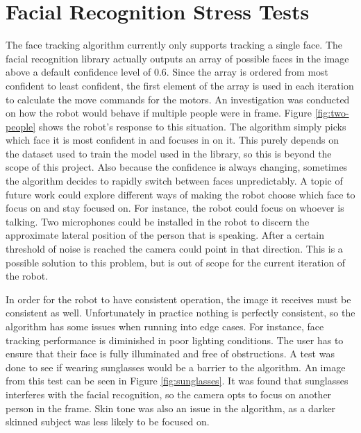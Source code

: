 \section{Facial Recognition Stress Tests}
The face tracking algorithm currently only supports tracking a single face. The facial recognition library actually outputs an array of possible faces in the image above a default confidence level of 0.6. Since the array is ordered from most confident to least confident, the first element of the array is used in each iteration to calculate the move commands for the motors. An investigation was conducted on how the robot would behave if multiple people were in frame. Figure \ref{fig:two-people} shows the robot's response to this situation. The algorithm simply picks which face it is most confident in and focuses in on it. This purely depends on the dataset used to train the model used in the library, so this is beyond the scope of this project. Also because the confidence is always changing, sometimes the algorithm decides to rapidly switch between faces unpredictably. A topic of future work could explore different ways of making the robot choose which face to focus on and stay focused on. For instance, the robot could focus on whoever is talking. Two microphones could be installed in the robot to discern the approximate lateral position of the person that is speaking. After a certain threshold of noise is reached the camera could point in that direction. This is a possible solution to this problem, but is out of scope for the current iteration of the robot. 

In order for the robot to have consistent operation, the image it receives must be consistent as well. Unfortunately in practice nothing is perfectly consistent, so the algorithm has some issues when running into edge cases. For instance, face tracking performance is diminished in poor lighting conditions. The user has to ensure that their face is fully illuminated and free of obstructions. A test was done to see if wearing sunglasses would be a barrier to the algorithm. An image from this test can be seen in Figure \ref{fig:sunglasses}. It was found that sunglasses interferes with the facial recognition, so the camera opts to focus on another person in the frame. Skin tone was also an issue in the algorithm, as a darker skinned subject was less likely to be focused on.

